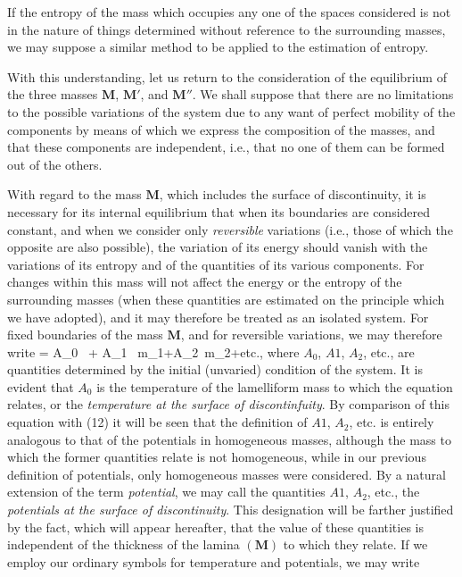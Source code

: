 \documentclass[12pt]{article}
\begin{document}
{If the entropy of the mass which occupies any one of the spaces considered is not in the nature of things determined without reference to the surrounding masses, we may suppose a similar method to be applied to the estimation of entropy.


With this understanding, let us return to the consideration of the equilibrium of the three masses $\mathbf{M}$, $\mathbf{M}'$, and $\mathbf{M}''$. We shall suppose that there are no limitations to the possible variations of the system due to any want of perfect mobility of the components by means of which we express the composition of the masses, and that these components are independent, i.e., that no one of them can be formed out of the others.


With regard to the mass $\mathbf{M}$, which includes the surface of discontinuity, it is necessary for its internal equilibrium that when its boundaries are considered constant, and when we consider only \textit{reversible} variations (i.e., those of which the opposite are also possible), the variation of its energy should vanish with the variations of its entropy and of the quantities of its various components. For changes within this mass will not affect the energy or the entropy of the surrounding masses (when these quantities are estimated on the principle which we have adopted), and it may therefore be treated as an isolated system. For fixed boundaries of the mass $\mathbf{M}$, and for reversible variations, we may therefore write
\eqs  \delta \epsilon= A_0 \, \delta \eta + A_1 \, \delta m_1+A_2\, \delta m_2+etc., \label{476} \eqe
where $A_0$, $A1$, $A_2$, etc., are quantities determined by the initial (unvaried) condition of the system. It is evident that $A_0$ is the temperature of the lamelliform mass to which the equation relates, or the \textit{temperature at the surface of discontinfuity}. By comparison of this equation with (12) it will be seen that the definition of $A1$, $A_2$, etc. is entirely analogous to that of the potentials in homogeneous masses, although the mass to which the former quantities relate is not homogeneous, while in our previous definition of potentials, only homogeneous masses were considered. By a natural extension of the term \textit{potential}, we may call the quantities $A1$, $A_2$, etc., the \textit{potentials at the surface of discontinuity}. This designation will be farther justified by the fact, which will appear hereafter, that the value of these quantities is independent of the thickness of the lamina $(\mathbf{M})$ to which they relate. If we employ our ordinary symbols for temperature and potentials, we may write
}
\end{document}
